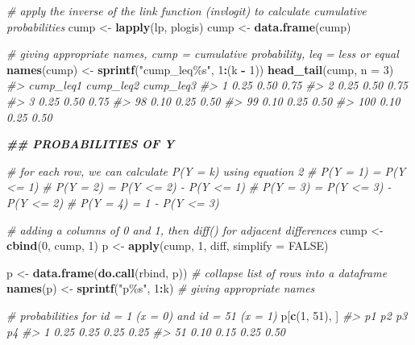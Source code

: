 \documentclass[
  man,floatsintext]{apa6}
\newenvironment{Shaded}{\begin{snugshade}}{\end{snugshade}}
\newcommand{\AttributeTok}[1]{\textcolor[rgb]{0.13,0.29,0.53}{#1}}
\newcommand{\CommentTok}[1]{\textcolor[rgb]{0.56,0.35,0.01}{\textit{#1}}}
\newcommand{\ConstantTok}[1]{\textcolor[rgb]{0.56,0.35,0.01}{#1}}
\newcommand{\DecValTok}[1]{\textcolor[rgb]{0.00,0.00,0.81}{#1}}
\newcommand{\DocumentationTok}[1]{\textcolor[rgb]{0.56,0.35,0.01}{\textbf{\textit{#1}}}}
\newcommand{\FunctionTok}[1]{\textcolor[rgb]{0.13,0.29,0.53}{\textbf{#1}}}
\newcommand{\NormalTok}[1]{#1}
\newcommand{\OtherTok}[1]{\textcolor[rgb]{0.56,0.35,0.01}{#1}}
\newcommand{\SpecialCharTok}[1]{\textcolor[rgb]{0.81,0.36,0.00}{\textbf{#1}}}
\newcommand{\StringTok}[1]{\textcolor[rgb]{0.31,0.60,0.02}{#1}}
\begin{document}
\begin{Shaded}
\begin{Highlighting}[]
\CommentTok{\# apply the inverse of the link function (invlogit) to calculate cumulative probabilities}
\NormalTok{cump }\OtherTok{\textless{}{-}} \FunctionTok{lapply}\NormalTok{(lp, plogis)}
\NormalTok{cump }\OtherTok{\textless{}{-}} \FunctionTok{data.frame}\NormalTok{(cump)}

\CommentTok{\# giving appropriate names, cump = cumulative probability, leq = less or equal}
\FunctionTok{names}\NormalTok{(cump) }\OtherTok{\textless{}{-}} \FunctionTok{sprintf}\NormalTok{(}\StringTok{"cump\_leq\%s"}\NormalTok{, }\DecValTok{1}\SpecialCharTok{:}\NormalTok{(k }\SpecialCharTok{{-}} \DecValTok{1}\NormalTok{))}
\FunctionTok{head\_tail}\NormalTok{(cump, }\AttributeTok{n =} \DecValTok{3}\NormalTok{)}
\CommentTok{\#\textgreater{}     cump\_leq1 cump\_leq2 cump\_leq3}
\CommentTok{\#\textgreater{} 1        0.25      0.50      0.75}
\CommentTok{\#\textgreater{} 2        0.25      0.50      0.75}
\CommentTok{\#\textgreater{} 3        0.25      0.50      0.75}
\CommentTok{\#\textgreater{} 98       0.10      0.25      0.50}
\CommentTok{\#\textgreater{} 99       0.10      0.25      0.50}
\CommentTok{\#\textgreater{} 100      0.10      0.25      0.50}

\DocumentationTok{\#\# PROBABILITIES OF Y}

\CommentTok{\# for each row, we can calculate P(Y = k) using equation 2}
\CommentTok{\# P(Y = 1) = P(Y \textless{}= 1)}
\CommentTok{\# P(Y = 2) = P(Y \textless{}= 2) {-} P(Y \textless{}= 1)}
\CommentTok{\# P(Y = 3) = P(Y \textless{}= 3) {-} P(Y \textless{}= 2)}
\CommentTok{\# P(Y = 4) = 1 {-} P(Y \textless{}= 3)}

\CommentTok{\# adding a columns of 0 and 1, then diff() for adjacent differences}
\NormalTok{cump }\OtherTok{\textless{}{-}} \FunctionTok{cbind}\NormalTok{(}\DecValTok{0}\NormalTok{, cump, }\DecValTok{1}\NormalTok{)}
\NormalTok{p }\OtherTok{\textless{}{-}} \FunctionTok{apply}\NormalTok{(cump, }\DecValTok{1}\NormalTok{, diff, }\AttributeTok{simplify =} \ConstantTok{FALSE}\NormalTok{)}

\NormalTok{p }\OtherTok{\textless{}{-}} \FunctionTok{data.frame}\NormalTok{(}\FunctionTok{do.call}\NormalTok{(rbind, p)) }\CommentTok{\# collapse list of rows into a dataframe}
\FunctionTok{names}\NormalTok{(p) }\OtherTok{\textless{}{-}} \FunctionTok{sprintf}\NormalTok{(}\StringTok{"p\%s"}\NormalTok{, }\DecValTok{1}\SpecialCharTok{:}\NormalTok{k) }\CommentTok{\# giving appropriate names}

\CommentTok{\# probabilities for id = 1 (x = 0) and id = 51 (x = 1)}
\NormalTok{p[}\FunctionTok{c}\NormalTok{(}\DecValTok{1}\NormalTok{, }\DecValTok{51}\NormalTok{), ]}
\CommentTok{\#\textgreater{}      p1   p2   p3   p4}
\CommentTok{\#\textgreater{} 1  0.25 0.25 0.25 0.25}
\CommentTok{\#\textgreater{} 51 0.10 0.15 0.25 0.50}


\end{Highlighting}
\end{Shaded}
\end{document}
